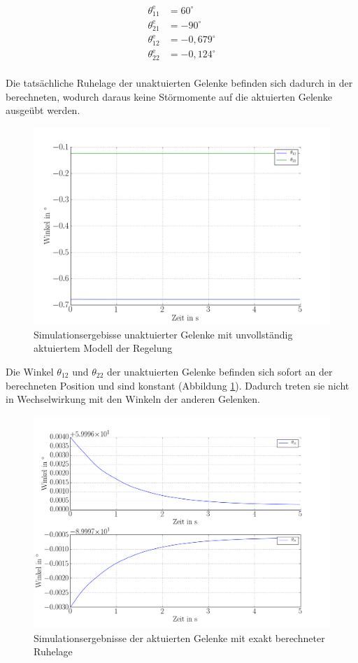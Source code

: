 \begin{align*}
\theta_{11}^\mathrm{e}&=60^\circ\\
\theta_{21}^\mathrm{e}&=-90^\circ\\
\theta_{12}^\mathrm{e}&=-0,679^\circ\\
\theta_{22}^\mathrm{e}&=-0,124^\circ\\
\end{align*}

Die tatsächliche Ruhelage der unaktuierten Gelenke befinden sich dadurch in der berechneten, wodurch daraus keine Störmomente auf die aktuierten Gelenke ausgeübt werden.

\begin{figure}[h]
\centering
\includegraphics[width=1\linewidth]{lsgunvollvoll_unakt.png}
\caption{Simulationsergebisse unaktuierter Gelenke mit unvollständig aktuiertem Modell der Regelung}
\label{fig:unvollMod}
\end{figure}

Die Winkel $\theta_{12}$ und $\theta_{22}$ der unaktuierten Gelenke befinden sich sofort an der berechneten Position und sind konstant (Abbildung \ref{fig:unvollMod}). Dadurch treten sie nicht in Wechselwirkung mit den Winkeln der anderen Gelenken.

\begin{figure}[h]
\centering
\includegraphics[width=1\linewidth]{lsgunvollvoll_akt.png}
\caption{Simulationsergebnisse der aktuierten Gelenke mit exakt berechneter Ruhelage}
\label{fig:lsgunvollvoll_unakt}
\end{figure}

